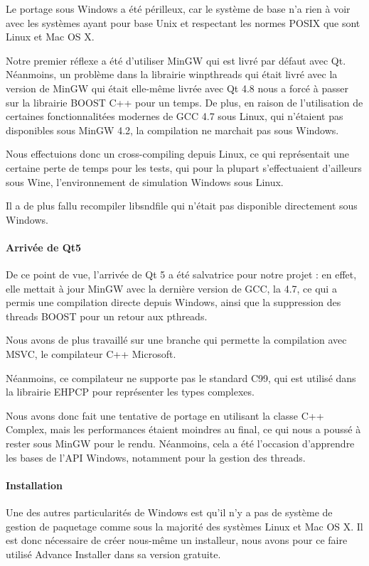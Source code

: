 Le portage sous Windows a été périlleux, car le système de base n'a rien à voir avec les systèmes ayant pour base Unix et respectant
les normes POSIX que sont Linux et Mac OS X.

Notre premier réflexe a été d'utiliser MinGW qui est livré par défaut avec Qt. Néanmoins, un problème
dans la librairie winpthreads qui était livré avec la version de MinGW qui était elle-même livrée avec Qt 4.8 nous a
forcé à passer sur la librairie BOOST C++ pour un temps. De plus, en raison de l'utilisation de certaines fonctionnalitées modernes
de \ac{GCC} 4.7 sous Linux, qui n'étaient pas disponibles sous MinGW 4.2, la compilation ne marchait pas sous Windows.

Nous effectuions donc un cross-compiling depuis Linux, ce qui représentait une certaine perte de temps pour les tests,
qui pour la plupart s'effectuaient d'ailleurs sous Wine, l'environnement de simulation Windows sous Linux.

Il a de plus fallu recompiler libsndfile qui n'était pas disponible directement sous Windows.

\paragraph{Arrivée de Qt5}
De ce point de vue, l'arrivée de Qt 5 a été salvatrice pour notre projet : en effet, elle mettait à jour MinGW
avec la dernière version de \ac{GCC}, la 4.7, ce qui a permis une compilation directe depuis Windows, ainsi que la suppression des
threads BOOST pour un retour aux pthreads.

Nous avons de plus travaillé sur une branche qui permette la compilation avec \ac{MSVC}, le compilateur C++ Microsoft.

Néanmoins, ce compilateur ne supporte pas le standard C99, qui est utilisé dans la librairie EHPCP pour représenter les types complexes.

Nous avons donc fait une tentative de portage en utilisant la classe C++ Complex, mais les performances étaient moindres au final,
ce qui nous a poussé à rester sous MinGW pour le rendu. Néanmoins, cela a été l'occasion d'apprendre les
bases de l'\ac{API} Windows, notamment pour la gestion des threads.

\paragraph{Installation}
Une des autres particularités de Windows est qu'il n'y a pas de système de gestion de paquetage comme sous la majorité des systèmes Linux et Mac OS X.
Il est donc nécessaire de créer nous-même un installeur, nous avons pour ce faire utilisé Advance Installer dans sa version gratuite.

